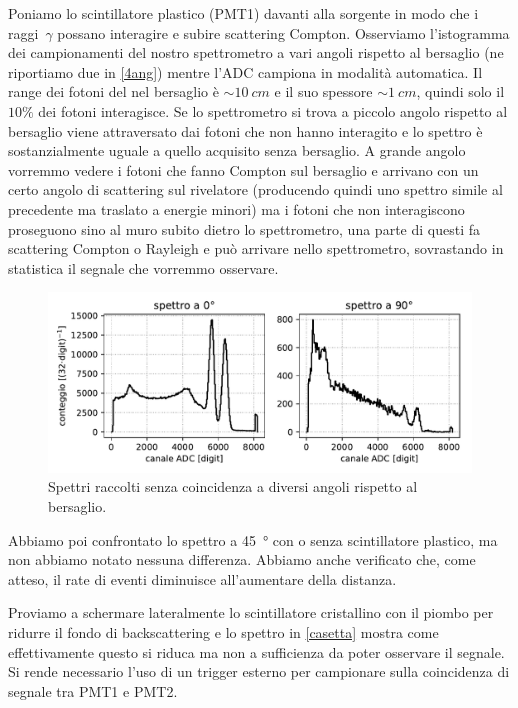 Poniamo lo scintillatore plastico (PMT1) davanti alla sorgente in modo che i raggi~$\gamma$ possano interagire e subire scattering Compton. Osserviamo l'istogramma dei campionamenti del nostro spettrometro a vari angoli rispetto al bersaglio (ne riportiamo due in \autoref{4ang}) mentre l'ADC campiona in modalità automatica.
Il range dei fotoni del \co\; nel bersaglio è $\sim\SI{10}{cm}$ e il suo spessore $\sim\SI{1}{cm}$, quindi solo il $10\%$ dei fotoni interagisce. 
Se lo spettrometro si trova a piccolo angolo rispetto al bersaglio viene attraversato dai fotoni che non hanno interagito e lo spettro è sostanzialmente uguale a quello acquisito senza bersaglio. A grande angolo vorremmo vedere i fotoni che fanno Compton sul bersaglio e arrivano con un certo angolo di scattering sul rivelatore (producendo quindi uno spettro simile al precedente ma traslato a energie minori) ma i fotoni che non interagiscono proseguono sino al muro subito dietro lo spettrometro, una parte di questi fa scattering Compton o Rayleigh e può arrivare nello spettrometro, sovrastando in statistica il segnale che vorremmo osservare.

\begin{figure}[h]
	\centering
	\includegraphics[width=\textwidth]{plotg}
	\caption{Spettri raccolti senza coincidenza a diversi angoli rispetto al bersaglio.}
	\label{4ang}
\end{figure}

Abbiamo poi confrontato lo spettro a \SI{45}{\degree} con o senza scintillatore plastico, ma non abbiamo notato nessuna differenza. Abbiamo anche verificato che, come atteso, il rate di eventi diminuisce all'aumentare della distanza.

Proviamo a schermare lateralmente lo scintillatore cristallino con il piombo per ridurre il fondo di backscattering e lo spettro in \autoref{casetta} mostra come effettivamente questo si riduca ma non a sufficienza da poter osservare il segnale.
Si rende necessario l'uso di un trigger esterno per campionare sulla coincidenza di segnale tra PMT1 e PMT2.

